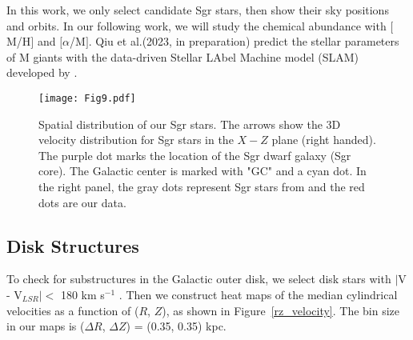 \documentclass[manuscript]{aastex62}
\begin{document}
\begin{CJK*}{UTF8}{gbsn}
In this work, we only select candidate Sgr stars, then show their sky positions and orbits. In our following work, we will study the chemical abundance with $[$M/H$]$ and $[\alpha$/M$]$. Qiu et al.(2023, in preparation) predict the stellar parameters of M giants with the data-driven Stellar LAbel Machine model (SLAM) developed by \citet{2020ApJS..246....9Z}. 

\begin{figure*}
 \centering  
   \texttt{[image: Fig9.pdf]}
   \caption{Spatial distribution of our Sgr stars. The arrows show the 3D velocity distribution for Sgr stars in the $X-Z$ plane (right handed). The purple dot marks the location of the Sgr dwarf galaxy (Sgr core). The Galactic center is marked with "GC" and a cyan dot. In the right panel, the gray dots represent Sgr stars from \citet{2019ApJ...886..154Y} and the red dots are our data.}
   \label{sgr}
\end{figure*}

\subsection{Disk Structures}

To check for substructures in the Galactic outer disk, we select disk stars with $\mid$V - V$_{LSR} \mid <$ 180 km s$^{-1}$ \citep{2004AJ....128.1177V, 2009MNRAS.399.1145S}. Then we construct heat maps of the median cylindrical velocities as a function of ($R$, $Z$), as shown in Figure~\ref{rz_velocity}. The bin size in our maps is ($\Delta R$, $\Delta Z$) = (0.35, 0.35) kpc.


\end{CJK*}
\end{document}
